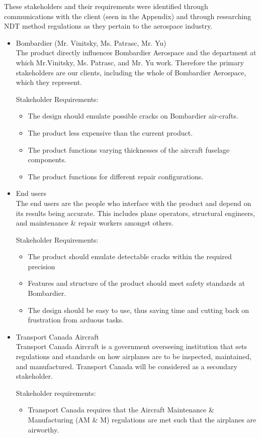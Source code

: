 \documentclass[12pt]{article}
\begin{document}
These stakeholders and their requirements were identified through communications with the client (seen in the Appendix) and through researching NDT method regulations as they pertain to the aerospace industry.

\begin{itemize}
\item Bombardier (Mr. Vinitsky, Ms. Patrasc, Mr. Yu)\hfill \\
The product directly influences Bombardier Aerospace and the department at which Mr.Vinitsky, Ms. Patrasc, and Mr. Yu work. Therefore the primary stakeholders are our clients, including the whole of Bombardier Aerospace, which they represent.

Stakeholder Requirements: 
\begin{itemize}
\item The design should emulate possible cracks on Bombardier air-crafts.
\item The product less expensive than the current product.
\item The product functions varying thicknesses of the aircraft fuselage components.
\item The product functions for different repair configurations.
\end{itemize}

\item End users \hfill \\
The end users are the people who interface with the product and depend on its results being accurate. This includes plane operators, structural engineers, and maintenance \& repair workers amongst others.
 
Stakeholder Requirements:
\begin{itemize}
\item The product should emulate detectable cracks within the required precision 
\item Features and structure of the product should meet safety standards at Bombardier. 
\item The design should be easy to use, thus saving time and cutting back on frustration from arduous tasks.
\end{itemize}

\item Transport Canada Aircraft \hfill \\
Transport Canada Aircraft is a government overseeing institution that sets regulations and standards on how airplanes are to be inspected, maintained, and manufactured. Transport Canada will be considered  as a secondary stakeholder.

Stakeholder requirements:
\begin{itemize}
\item Transport Canada requires that the  Aircraft Maintenance \& Manufacturing (AM \& M) regulations are met such that the airplanes are airworthy.
\end{itemize} 

\end{itemize}
\newpage
\end{document}
